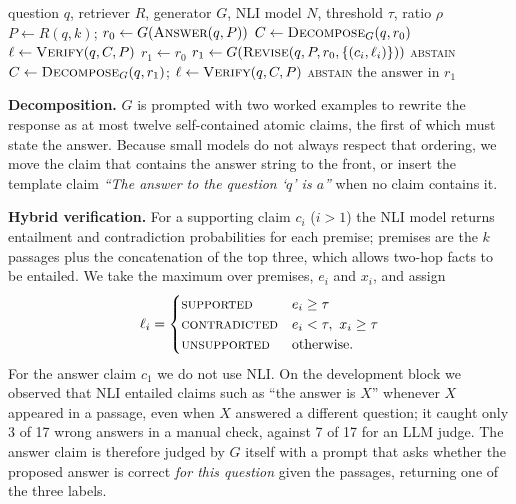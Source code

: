\documentclass[conference]{IEEEtran}
\begin{document}
\begin{algorithm}[t]
\caption{RAG-Verify (one question)}\label{alg:rv}
\begin{algorithmic}[1]
\REQUIRE question $q$, retriever $R$, generator $G$, NLI model $N$, threshold $\tau$, ratio $\rho$
\STATE $P \gets R(q,k)$; \quad $r_0 \gets G(\textsc{Answer}(q,P))$
\STATE $C \gets \textsc{Decompose}_G(q,r_0)$ 
\STATE $\ell \gets \textsc{Verify}(q,C,P)$ 
\STATE $r_1 \gets r_0$
  \STATE $r_1 \gets G(\textsc{Revise}(q,P,r_0,\{(c_i,\ell_i)\}))$
    \RETURN \textsc{abstain}
  \ENDIF
  \STATE $C \gets \textsc{Decompose}_G(q,r_1)$; \quad $\ell \gets \textsc{Verify}(q,C,P)$
\ENDIF
{}
  \RETURN \textsc{abstain}
\ENDIF
\RETURN the answer in $r_1$
\end{algorithmic}
\end{algorithm}

\textbf{Decomposition.} $G$ is prompted with two worked examples to rewrite the response as at most twelve self-contained atomic claims, the first of which must state the answer. Because small models do not always respect that ordering, we move the claim that contains the answer string to the front, or insert the template claim \emph{``The answer to the question `$q$' is $a$''} when no claim contains it.

\textbf{Hybrid verification.} For a supporting claim $c_i$ ($i>1$) the NLI model returns entailment and contradiction probabilities for each premise; premises are the $k$ passages plus the concatenation of the top three, which allows two-hop facts to be entailed. We take the maximum over premises, $e_i$ and $x_i$, and assign
\begin{equation}
\ell_i=\begin{cases}\textsc{supported} & e_i\ge\tau\\ \textsc{contradicted} & e_i<\tau,\ x_i\ge\tau\\ \textsc{unsupported} & \text{otherwise.}\end{cases}\label{eq:label}
\end{equation}
For the answer claim $c_1$ we do not use NLI. On the development block we observed that NLI entailed claims such as ``the answer is $X$'' whenever $X$ appeared in a passage, even when $X$ answered a different question; it caught only 3 of 17 wrong answers in a manual check, against 7 of 17 for an LLM judge. The answer claim is therefore judged by $G$ itself with a prompt that asks whether the proposed answer is correct \emph{for this question} given the passages, returning one of the three labels.
\end{document}
